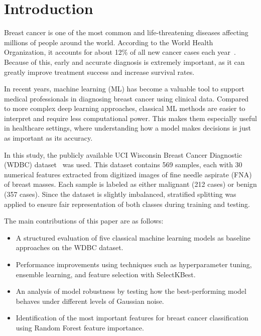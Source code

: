 \documentclass[conference]{IEEEtran}
\begin{document}
\section{Introduction}

Breast cancer is one of the most common and life-threatening diseases affecting millions of people around the world. According to the World Health Organization, it accounts for about 12\% of all new cancer cases each year~\cite{who2023}. Because of this, early and accurate diagnosis is extremely important, as it can greatly improve treatment success and increase survival rates.

In recent years, machine learning (ML) has become a valuable tool to support medical professionals in diagnosing breast cancer using clinical data. Compared to more complex deep learning approaches, classical ML methods are easier to interpret and require less computational power. This makes them especially useful in healthcare settings, where understanding how a model makes decisions is just as important as its accuracy.

In this study, the publicly available UCI Wisconsin Breast Cancer Diagnostic (WDBC) dataset~\cite{uci_wdbc} was used. This dataset contains 569 samples, each with 30 numerical features extracted from digitized images of fine needle aspirate (FNA) of breast masses. Each sample is labeled as either malignant (212 cases) or benign (357 cases). Since the dataset is slightly imbalanced, stratified splitting was applied to ensure fair representation of both classes during training and testing.

The main contributions of this paper are as follows:
\begin{itemize}
\item A structured evaluation of five classical machine learning models as baseline approaches on the WDBC dataset.
\item Performance improvements using techniques such as hyperparameter tuning, ensemble learning, and feature selection with SelectKBest.
\item An analysis of model robustness by testing how the best-performing model behaves under different levels of Gaussian noise.
\item Identification of the most important features for breast cancer classification using Random Forest feature importance.
\end{itemize}
\end{document}
